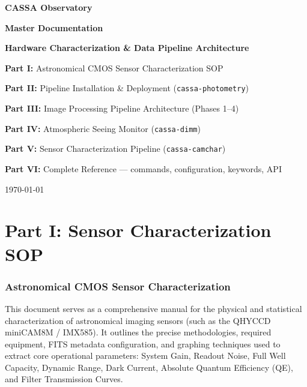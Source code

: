 \documentclass[11pt,a4paper]{article}
\begin{document}
\begin{titlepage}
    \centering
    \vspace*{2in}
    {\Huge \textcolor{primary}{\textbf{CASSA Observatory}}\par}
    \vspace{0.3in}
    {\Huge \textcolor{primary}{\textbf{Master Documentation}}\par}
    \vspace{0.5in}
    {\Large \textcolor{secondary}{\textbf{Hardware Characterization \& Data Pipeline Architecture}}\par}
    \vspace{1.5in}
    {\large \textbf{Part I:} Astronomical CMOS Sensor Characterization SOP \par}
    \vspace{0.2in}
    {\large \textbf{Part II:} Pipeline Installation \& Deployment (\texttt{cassa-photometry}) \par}
    \vspace{0.2in}
    {\large \textbf{Part III:} Image Processing Pipeline Architecture (Phases 1--4) \par}
    \vspace{0.2in}
    {\large \textbf{Part IV:} Atmospheric Seeing Monitor (\texttt{cassa-dimm}) \par}
    \vspace{0.2in}
    {\large \textbf{Part V:} Sensor Characterization Pipeline (\texttt{cassa-camchar}) \par}
    \vspace{0.2in}
    {\large \textbf{Part VI:} Complete Reference --- commands, configuration, keywords, API \par}
    \vfill
    \vspace{0.5in}
    {\normalsize \today\par}
\end{titlepage}

\tableofcontents
\newpage

\part*{Part I: Sensor Characterization SOP}

\section{Astronomical CMOS Sensor Characterization}
This document serves as a comprehensive manual for the physical and statistical characterization of astronomical imaging sensors (such as the QHYCCD miniCAM8M / IMX585). It outlines the precise methodologies, required equipment, FITS metadata configuration, and graphing techniques used to extract core operational parameters: System Gain, Readout Noise, Full Well Capacity, Dynamic Range, Dark Current, Absolute Quantum Efficiency (QE), and Filter Transmission Curves.
\end{document}
